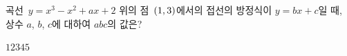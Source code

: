 곡선~$y=x^3-x^2+ax+2$ 위의 점~$(1{,}\mkern3mu\mathopen{}3)$에서의 접선의 방정식이 $y=bx+c$일 때, 상수 $a$, $b$, $c$에 대하여 $abc$의 값은?
\begin{choices32}{$1$}{$2$}{$3$}{$4$}{$5$}\end{choices32}
